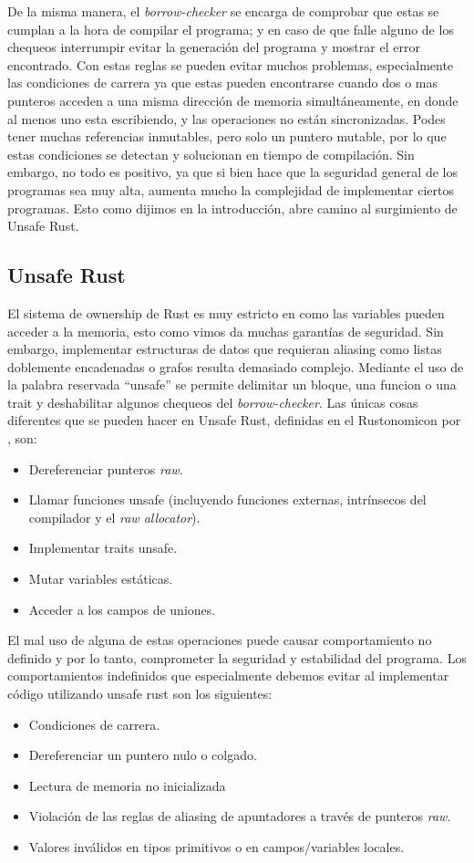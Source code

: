 De la misma manera, el \textit{borrow-checker} se encarga de comprobar que estas se cumplan a la hora de compilar el programa; y en caso de que falle alguno de los chequeos interrumpir evitar la generación del programa y mostrar el error encontrado. Con estas reglas se pueden evitar muchos problemas, especialmente las condiciones de carrera ya que estas pueden encontrarse cuando dos o mas punteros acceden a una misma dirección de memoria simultáneamente, en donde al menos uno esta escribiendo, y las operaciones no están sincronizadas. Podes tener muchas referencias inmutables, pero solo un puntero mutable, por lo que estas condiciones se detectan y solucionan en tiempo de compilación.
Sin embargo, no todo es positivo, ya que si bien hace que la seguridad general de los programas sea muy alta, aumenta mucho la complejidad de implementar ciertos programas. Esto como dijimos en la introducción, abre camino al surgimiento de Unsafe Rust.

\subsection{Unsafe Rust}

El sistema de ownership de Rust es muy estricto en como las variables pueden acceder a la memoria, esto como vimos da muchas garantías de seguridad. Sin embargo, implementar estructuras de datos que requieran aliasing como listas doblemente encadenadas o grafos resulta demasiado complejo. Mediante el uso de la palabra reservada ``unsafe'' se permite delimitar un bloque, una funcion o una trait y deshabilitar algunos chequeos del \textit{borrow-checker}. Las únicas cosas diferentes que se pueden hacer en Unsafe Rust, definidas en el Rustonomicon por \cite{rustonomicon}, son:
\begin{itemize}[noitemsep]
  \item Dereferenciar punteros \textit{raw}.
  \item Llamar funciones unsafe (incluyendo funciones externas, intrínsecos del compilador y el \textit{raw allocator}).
  \item Implementar traits unsafe.
  \item Mutar variables estáticas.
  \item Acceder a los campos de uniones.
\end{itemize}
El mal uso de alguna de estas operaciones puede causar comportamiento no definido y por lo tanto, comprometer la seguridad y estabilidad del programa. Los comportamientos indefinidos que especialmente debemos evitar al implementar código utilizando unsafe rust son los siguientes:
\begin{itemize}[noitemsep]
  \item Condiciones de carrera.
  \item Dereferenciar un puntero nulo o colgado.
  \item Lectura de memoria no inicializada
  \item Violación de las reglas de aliasing de apuntadores a través de punteros \textit{raw}.
  \item Valores inválidos en tipos primitivos o en campos/variables locales.
\end{itemize}

